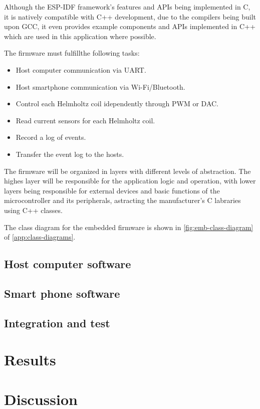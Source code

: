 \documentclass[10pt,twocolumn,letterpaper]{article}
\begin{document}
Although the ESP-IDF framework's features and APIs being implemented in C, it is natively compatible with C++ development, due to the compilers being built upon GCC, it even provides example components and APIs implemented in C++ which are used in this application where possible.

The firmware must fulfillthe following tasks:
\begin{itemize}
  \item Host computer communication via UART.
  \item Host smartphone communication via Wi-Fi/Bluetooth.
  \item Control each Helmholtz coil idependently through PWM or DAC.
  \item Read current sensors for each Helmholtz coil.
  \item Record a log of events.
  \item Transfer the event log to the hosts.
\end{itemize}

The firmware will be organized in layers with different levels of abstraction. The highes layer will be responsible for the application logic and operation, with lower layers being responsible for external devices and basic functions of the microcontroller and its peripherals, astracting the manufacturer's C labraries using C++ classes.

The class diagram for the embedded firmware is shown in \autoref{fig:emb-class-diagram} of \autoref{app:class-diagrams}.

\iffalse

\subsection{Host computer software}


\subsection{Smart phone software}


\subsection{Integration and test}


\section{Results}


\section{Discussion}
\end{document}
